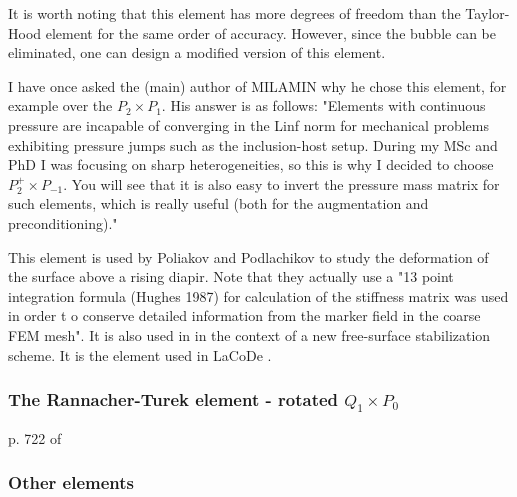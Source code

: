 It is worth noting that this element has more degrees of freedom  than the 
Taylor-Hood element for the same order of accuracy. However, since the 
bubble can be eliminated, one can design a modified version of this element.


\begin{remark}
I have once asked the (main) author of MILAMIN why he chose this element, for 
example over the $P_2\times P_1$. His answer is as follows:
"Elements with continuous pressure  are incapable of converging in the Linf 
norm for mechanical problems exhibiting pressure jumps such as the inclusion-host setup. 
During my MSc and PhD I was focusing on sharp heterogeneities, so this is why I decided 
to choose $P_2^+\times P_{-1}$. 
You will see that it is also easy to invert the pressure mass matrix for such elements, 
which is really useful (both for the augmentation and preconditioning)."
\end{remark}

This element is used by Poliakov and Podlachikov \cite{popo92} to study the deformation of the surface above a rising diapir. Note that they actually use a "13 point integration formula (Hughes
1987) for calculation of the stiffness matrix was used in order
t o conserve detailed information from the marker field in
the coarse FEM mesh". 
It is also used in \cite{anmp15} in the context of a new free-surface stabilization scheme. 
It is the element used in LaCoDe \cite{demh19}.








\subsubsection{The Rannacher-Turek element - rotated $Q_1\times P_0$}

p. 722 of \cite{john16}

\cite{horg95,knob00,lisi12,maky17}


\subsubsection{Other elements}

